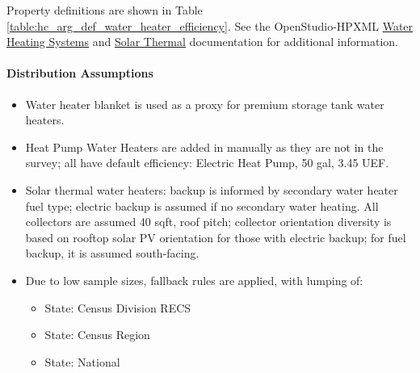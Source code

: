 

Property definitions are shown in Table \ref{table:hc_arg_def_water_heater_efficiency}. See the OpenStudio-HPXML \href{https://openstudio-hpxml.readthedocs.io/en/v1.10.0/workflow_inputs.html#hpxml-water-heating-systems}{Water Heating Systems} and \href{https://openstudio-hpxml.readthedocs.io/en/v1.10.0/workflow_inputs.html#hpxml-solar-thermal}{Solar Thermal} documentation for additional information.



\paragraph{Distribution Assumptions}
% 
\begin{itemize}
\item
  Water heater blanket is used as a proxy for premium storage tank water
  heaters.
\item
  Heat Pump Water Heaters are added in manually as they are not in the
  survey; all have default efficiency: Electric Heat Pump, 50 gal, 3.45 UEF.
\item
  Solar thermal water heaters: backup is informed by secondary water heater fuel type; electric backup is assumed if no secondary water heating. All collectors are assumed 40 sqft, roof pitch; collector orientation diversity is based on rooftop solar PV orientation for those with electric backup; for fuel backup, it is assumed south-facing.
\item
  Due to low sample sizes, fallback rules are applied, with lumping of:
  
  \begin{itemize}
  \item
    State: Census Division RECS
  \item
    State: Census Region
    \item
    State: National
  \end{itemize}
\end{itemize}
